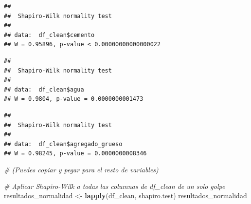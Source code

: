 \documentclass[
]{book}
\newenvironment{Shaded}{\begin{snugshade}}{\end{snugshade}}
\newcommand{\CommentTok}[1]{\textcolor[rgb]{0.56,0.35,0.01}{\textit{#1}}}
\newcommand{\FunctionTok}[1]{\textcolor[rgb]{0.13,0.29,0.53}{\textbf{#1}}}
\newcommand{\NormalTok}[1]{#1}
\newcommand{\OtherTok}[1]{\textcolor[rgb]{0.56,0.35,0.01}{#1}}
\newcommand{\SpecialCharTok}[1]{\textcolor[rgb]{0.81,0.36,0.00}{\textbf{#1}}}
\begin{document}
\begin{Shaded}
\end{Shaded}

\begin{verbatim}
## 
##  Shapiro-Wilk normality test
## 
## data:  df_clean$cemento
## W = 0.95896, p-value < 0.00000000000000022
\end{verbatim}

\begin{Shaded}
\end{Shaded}

\begin{verbatim}
## 
##  Shapiro-Wilk normality test
## 
## data:  df_clean$agua
## W = 0.9804, p-value = 0.0000000001473
\end{verbatim}

\begin{Shaded}
\end{Shaded}

\begin{verbatim}
## 
##  Shapiro-Wilk normality test
## 
## data:  df_clean$agregado_grueso
## W = 0.98245, p-value = 0.0000000008346
\end{verbatim}

\begin{Shaded}
\begin{Highlighting}[]
\CommentTok{\# (Puedes copiar y pegar para el resto de variables)}

\CommentTok{\# Aplicar Shapiro{-}Wilk a todas las columnas de df\_clean de un solo golpe}
\NormalTok{resultados\_normalidad }\OtherTok{\textless{}{-}} \FunctionTok{lapply}\NormalTok{(df\_clean, shapiro.test)}
\NormalTok{resultados\_normalidad}
\end{Highlighting}
\end{Shaded}
\end{document}
